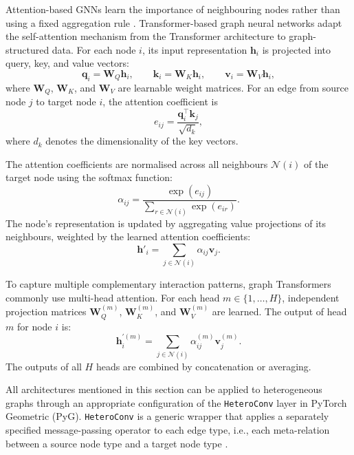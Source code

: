 Attention-based GNNs learn the importance of neighbouring nodes rather than
using a fixed aggregation rule \cite{velickovic2018graphattention}.
Transformer-based graph neural networks adapt the self-attention mechanism
from the Transformer architecture \textcite{vaswani2017attention} to
graph-structured data.
For each node $i$, its input representation $\mathbf{h}_i$ is projected into
query, key, and value vectors:
\begin{equation}
\mathbf{q}_i = \mathbf{W}_{Q}\mathbf{h}_i, \qquad
\mathbf{k}_i = \mathbf{W}_{K}\mathbf{h}_i, \qquad
\mathbf{v}_i = \mathbf{W}_{V}\mathbf{h}_i,
\end{equation}
where $\mathbf{W}_{Q}$, $\mathbf{W}_{K}$, and $\mathbf{W}_{V}$ are learnable
weight matrices.
For an edge from source node $j$ to target node $i$, the attention
coefficient is
\begin{equation}
    e_{ij} =
    \frac{\mathbf{q}_{i}^{\top}\mathbf{k}_{j}}{\sqrt{d_k}},
    \end{equation}
    where $d_k$ denotes the dimensionality of the key vectors.

The attention coefficients are normalised across all neighbours
$\mathcal{N}(i)$ of the target node using the softmax function:
    \begin{equation}
    \alpha_{ij} =
    \frac{\exp(e_{ij})}
    {\sum_{r \in \mathcal{N}(i)} \exp(e_{ir})}.
    \end{equation}
The node's representation is updated by aggregating value projections of
its neighbours, weighted by the learned attention coefficients:
\begin{equation}
\mathbf{h}'_i =
\sum_{j \in \mathcal{N}(i)}
\alpha_{ij}\mathbf{v}_{j}.
\end{equation}

To capture multiple complementary interaction patterns, graph Transformers
commonly use multi-head attention.
For each head $m \in \{1, \ldots, H\}$, independent projection matrices
$\mathbf{W}_{Q}^{(m)}$, $\mathbf{W}_{K}^{(m)}$, and
$\mathbf{W}_{V}^{(m)}$ are learned.
The output of head $m$ for node $i$ is:
\begin{equation}
\mathbf{h}_i^{\prime(m)} =
\sum_{j \in \mathcal{N}(i)}
\alpha_{ij}^{(m)}\mathbf{v}_{j}^{(m)}.
\end{equation}
The outputs of all $H$ heads are combined by concatenation or averaging.

All architectures mentioned in this section can be applied to heterogeneous
graphs through an appropriate configuration of the \texttt{HeteroConv} layer in
PyTorch Geometric (PyG). \texttt{HeteroConv} is a generic wrapper that applies
a separately specified message-passing operator to each edge type, i.e., each
meta-relation between a source node type and a target node type
\textcite{wojcik2026grafowe}.

